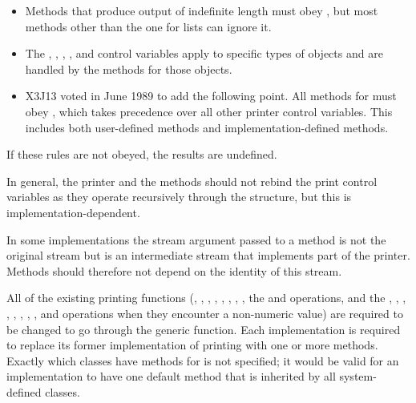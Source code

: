 \begin{defun}
\begin{itemize}
\item 
Methods that produce output of indefinite length must obey
, but most methods other than the one for lists can
ignore it.

\item 
The , , , 
, and  control variables apply
to specific types of objects and are handled by the methods for those
objects.

\item X3J13 voted in June 1989  to add the following point.
   All methods for  must obey ,
   which takes precedence over all other printer control variables.  This
   includes both user-defined methods and implementation-defined methods.
\end{itemize}

If these rules are not obeyed, the results are undefined.

In general, the printer and the  methods should not
rebind the print control variables as they operate recursively through the
structure, but this is implementation-dependent.

In some implementations the stream argument passed to a 
 method is not the original stream but is an
intermediate stream that implements part of the printer.  Methods
should therefore not depend on the identity of this stream.

All of the existing printing functions (, , 
, , , , 
, , the  and 
  operations, and the , ,
, , , \cd{{\Xtilde}\$}, 
, , and   operations when they
encounter a non-numeric value) are required to be changed to go
through the  generic function.  Each implementation is
required to replace its former implementation of printing with one or
more  methods.  Exactly which classes have methods for
 is not specified; it would be valid for an implementation
to have one default method that is inherited by all system-defined
classes.
\end{defun}

